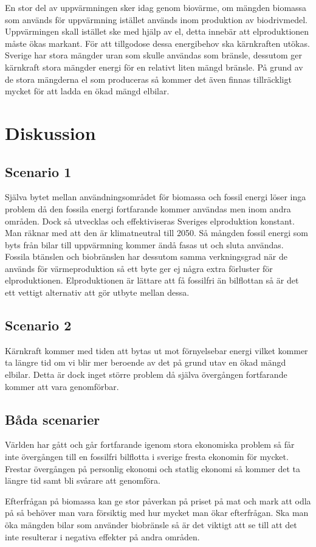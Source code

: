 \documentclass[a4paper,11pt,fleqn, titlepage]{article}
\begin{document}
En stor del av uppvärmningen sker idag genom biovärme, om mängden biomassa som används för uppvärmning istället används inom produktion av biodrivmedel. Uppvärmingen skall istället ske med hjälp av el, detta innebär att elproduktionen måste ökas markant. För att tillgodose dessa energibehov ska kärnkraften utökas. Sverige har stora mängder uran som skulle användas som bränsle, dessutom ger kärnkraft stora mängder energi för en relativt liten mängd bränsle. På grund av de stora mängderna el som produceras så kommer det även finnas tillräckligt mycket för att ladda en ökad mängd elbilar.


\section{Diskussion}

\subsection{Scenario 1}

Själva bytet mellan användningsområdet för biomassa och fossil energi löser inga problem då den fossila energi fortfarande kommer användas men inom andra områden. Dock så utvecklas och effektiviseras Sveriges elproduktion konstant. Man räknar med att den är klimatneutral till 2050. Så mångden fossil energi som byts från bilar till uppvärmning kommer ändå fasas ut och sluta användas. Fossila btänslen och biobränslen har dessutom samma verkningsgrad när de används för värmeproduktion så ett byte ger ej några extra förluster för elproduktionen.  Elproduktionen är lättare att få fossilfri än bilflottan så är det ett vettigt alternativ att gör utbyte mellan dessa.

\subsection{Scenario 2}
Kärnkraft kommer med tiden att bytas ut mot förnyelsebar energi vilket kommer ta längre tid om vi blir mer beroende av det på grund utav en ökad mängd elbilar. Detta är dock inget större problem då själva övergången fortfarande kommer att vara genomförbar.



\subsection{Båda scenarier}
Världen har gått och går fortfarande igenom stora ekonomiska problem så får inte övergången till en fossilfri bilflotta i sverige fresta ekonomin för mycket. Frestar övergången på personlig ekonomi och statlig ekonomi så kommer det ta längre tid samt bli svårare att genomföra.


Efterfrågan på biomassa kan ge stor påverkan på priset på mat och mark att odla på så behöver man vara försiktig med hur mycket man ökar efterfrågan. Ska man öka mängden bilar som använder biobränsle så är det viktigt att se till att det inte resulterar i negativa effekter på andra områden. 
\end{document}
